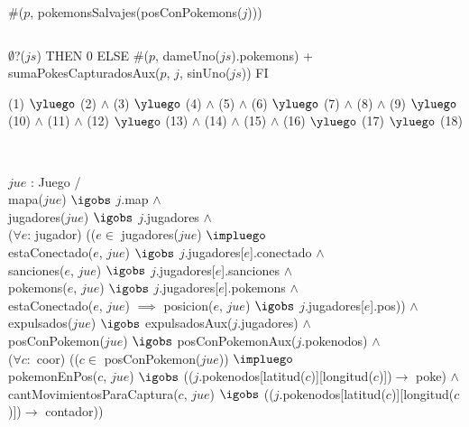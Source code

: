 \begin{Representacion}
%
{$\#$($p$, pokemonsSalvajes(posConPokemons($j$)))} 
$ $\newline

%
$ $\newline

%
{\IF $\emptyset$?($js$) THEN 0 ELSE  
$\#$($p$, dameUno($js$).pokemons) + sumaPokesCapturadosAux($p$, $j$, sinUno($js$))
FI} 
$ $\newline


%
{(1) $\yluego$ (2) $\land$ (3) $\yluego$ (4) $\land$ (5) $\land$ (6) $\yluego$ (7) $\land$ (8) $\land$ (9) $\yluego$\\
 (10) $\land$ (11) $\land$ (12) $\yluego$ (13) $\land$ (14) $\land$ (15) $\land$ (16) $\yluego$ (17) $\yluego$ (18)}

$ $\newline
$ $\newline



%
{
$jue$ : Juego / \\
	mapa($jue$) $\igobs$ $j$.map $\land$ \\
	jugadores($jue$) $\igobs$ $j$.jugadores $\land$ \\ 

	($\forall e$: jugador) (($e \in$ jugadores($jue$) $\impluego$ \\
		estaConectado($e$, $jue$) $\igobs$ $j$.jugadores[$e$].conectado $\land$ \\
		sanciones($e$, $jue$) $\igobs$ $j$.jugadores[$e$].sanciones $\land$ \\
		pokemons($e$, $jue$) $\igobs$ $j$.jugadores[$e$].pokemons $\land$ \\
		estaConectado($e$, $jue$) $\implies$ posicion($e$, $jue$) $\igobs$ $j$.jugadores[$e$].pos)) $\land$ \\

	expulsados($jue$) $\igobs$ expulsadosAux($j$.jugadores) $\land$ \\
	posConPokemon($jue$) $\igobs$ posConPokemonAux($j$.pokenodos) $\land$ \\
	
	($\forall c:$ coor) (($c \in$ posConPokemon($jue$)) $\impluego$ \\
		pokemonEnPos($c$, $jue$) $\igobs$ (($j$.pokenodos[latitud($c$)][longitud($c$)])$ \rightarrow$ poke) $\land$ \\
		cantMovimientosParaCaptura($c$, $jue$) $\igobs$ (($j$.pokenodos[latitud($c$)][longitud($c$)])$ \rightarrow$ contador))
}%

\end{Representacion}

